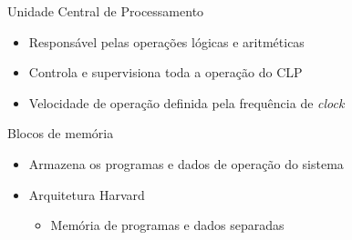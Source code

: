 \documentclass[aspectratio=169,
				xcolor=table]{beamer}
\begin{document}
	\begin{frame}{Unidade Central de Processamento}
		\begin{itemize}
			\item Responsável pelas operações lógicas e aritméticas
			\vspace{1em}
			\item Controla e supervisiona toda a operação do CLP
			\vspace{1em}
			\item Velocidade de operação definida pela frequência de \textit{clock}
		\end{itemize}
	\end{frame}	
	
	\begin{frame}{Blocos de memória}
		\begin{itemize}
			\item Armazena os programas e dados de operação do sistema
			\vspace{1em}
			\item Arquitetura Harvard
			\begin{itemize}
				\item Memória de programas e dados \alert{separadas}
			\end{itemize}
		\end{itemize}
		
	\end{frame}
	
\end{document}
